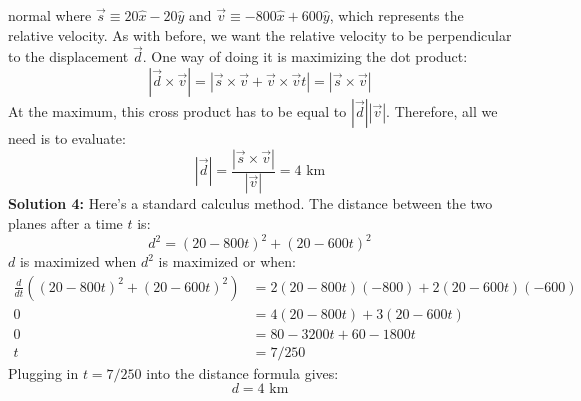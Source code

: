 \begin{solution}{normal}
where $\vec{s} \equiv 20\hat{x}-20\hat{y}$ and $\vec{v}\equiv -800\hat{x}+600\hat{y}$, which represents the relative velocity. As with before, we want the relative velocity to be perpendicular to the displacement $\vec{d}$. One way of doing it is maximizing the dot product:
$$|\vec{d} \times \vec{v}| = |\vec{s}\times\vec{v} + \vec{v}\times\vec{v}t| = |\vec{s}\times\vec{v}|$$
At the maximum, this cross product has to be equal to $|\vec{d}||\vec{v}|$. Therefore, all we need is to evaluate:
$$|\vec{d}| = \frac{|\vec{s}\times\vec{v}|}{|\vec{v}|} = \boxed{4 \text{ km}}$$
\tcbline
\textbf{Solution 4:}
Here's a standard calculus method. The distance between the two planes after a time $t$ is:
$$d^2 = (20-800t)^2+(20-600t)^2$$
$d$ is maximized when $d^2$ is maximized or when:
\begin{align*}
\frac{d}{dt} \left((20-800t)^2+(20-600t)^2\right) &= 2(20-800t)(-800)+2(20-600t)(-600)\\
0 &= 4(20-800t)+3(20-600t) \\
0 &= 80-3200t+60-1800t \\
t &= 7/250
\end{align*}
Plugging in $t=7/250$ into the distance formula gives:
$$d=\boxed{4 \text{ km}}$$
\end{solution}